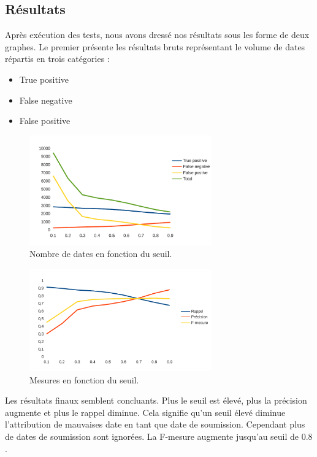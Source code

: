 \documentclass[a4paper,french,10pt]{article}
\begin{document}
\subsection{Résultats}

Après exécution des tests, nous avons dressé nos résultats sous les forme de deux graphes. Le premier présente les résultats bruts représentant le volume de dates répartis en trois catégories : 

\begin{itemize}
\item True positive
\item False negative
\item False positive
\end{itemize}

\begin{figure}[H]
\centering
\includegraphics[width=0.7\textwidth]{files/eval_total}
\caption{Nombre de dates en fonction du seuil.}
\label{fig:eval_total}
\end{figure}

\begin{figure}[H]
\centering
\includegraphics[width=0.7\textwidth]{files/eval_mesures}
\caption{Mesures en fonction du seuil.}
\label{fig:eval_mesures}
\end{figure}

Les résultats finaux semblent concluants. Plus le seuil est élevé, plus la précision augmente et plus le rappel diminue. Cela signifie qu'un seuil élevé diminue l'attribution de mauvaises date en tant que date de soumission. Cependant plus de dates de soumission sont ignorées. La F-mesure augmente jusqu'au seuil de $0.8$.
\end{document}
